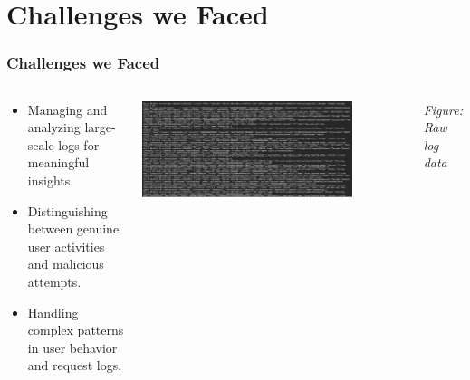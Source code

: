 \documentclass[10pt, a4paper]{beamer}
\begin{document}
\section{Challenges we Faced}
\begin{frame}
	\frametitle{Challenges we Faced}
	
	\begin{columns}[T,onlytextwidth]
		
		\begin{block}{}
			\begin{itemize}
				\item Managing and analyzing large-scale logs for meaningful insights.
				\item Distinguishing between genuine user activities and malicious attempts.
				\item Handling complex patterns in user behavior and request logs.
			\end{itemize}
		\end{block}
		
		\vfill
		
		\centering
		\includegraphics[width=0.8\textwidth]{images/LogSS.png} %
		
		\vskip 0.1cm %
		\centering
		\textit{Figure: Raw log data} %
		
	\end{columns}
	
\end{frame}


	
\end{document}
